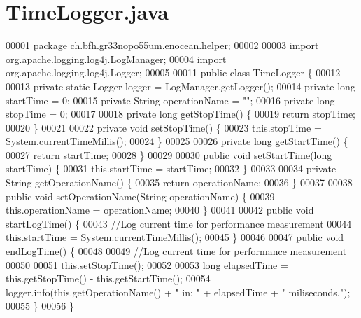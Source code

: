\section{Time\+Logger.\+java}
\label{TimeLogger_8java_source}

\begin{DoxyCode}
00001 \textcolor{keyword}{package }ch.bfh.gr33nopo55um.enocean.helper;
00002 
00003 \textcolor{keyword}{import} org.apache.logging.log4j.LogManager;
00004 \textcolor{keyword}{import} org.apache.logging.log4j.Logger;
00005 
00011 \textcolor{keyword}{public} \textcolor{keyword}{class }TimeLogger \{
00012 
00013     \textcolor{keyword}{private} \textcolor{keyword}{static} Logger logger = LogManager.getLogger();
00014     \textcolor{keyword}{private} \textcolor{keywordtype}{long} startTime = 0;
00015     \textcolor{keyword}{private} String operationName = \textcolor{stringliteral}{""};
00016     \textcolor{keyword}{private} \textcolor{keywordtype}{long} stopTime = 0;
00017 
00018     \textcolor{keyword}{private} \textcolor{keywordtype}{long} getStopTime() \{
00019         \textcolor{keywordflow}{return} stopTime;
00020     \}
00021 
00022     \textcolor{keyword}{private} \textcolor{keywordtype}{void} setStopTime() \{
00023         this.stopTime = System.currentTimeMillis();
00024     \}
00025 
00026     \textcolor{keyword}{private} \textcolor{keywordtype}{long} getStartTime() \{
00027         \textcolor{keywordflow}{return} startTime;
00028     \}
00029 
00030     \textcolor{keyword}{public} \textcolor{keywordtype}{void} setStartTime(\textcolor{keywordtype}{long} startTime) \{
00031         this.startTime = startTime;
00032     \}
00033 
00034     \textcolor{keyword}{private} String getOperationName() \{
00035         \textcolor{keywordflow}{return} operationName;
00036     \}
00037 
00038     \textcolor{keyword}{public} \textcolor{keywordtype}{void} setOperationName(String operationName) \{
00039         this.operationName = operationName;
00040     \}
00041 
00042     \textcolor{keyword}{public} \textcolor{keywordtype}{void} startLogTime() \{
00043         \textcolor{comment}{//Log current time for performance measurement}
00044         this.startTime = System.currentTimeMillis();
00045     \}
00046 
00047     \textcolor{keyword}{public} \textcolor{keywordtype}{void} endLogTime() \{
00048 
00049         \textcolor{comment}{//Log current time for performance measurement}
00050 
00051         this.setStopTime();
00052 
00053         \textcolor{keywordtype}{long} elapsedTime = this.getStopTime() - this.getStartTime();
00054         logger.info(this.getOperationName() + \textcolor{stringliteral}{" in: "} + elapsedTime + \textcolor{stringliteral}{" miliseconds."});
00055     \}
00056 \}
\end{DoxyCode}
